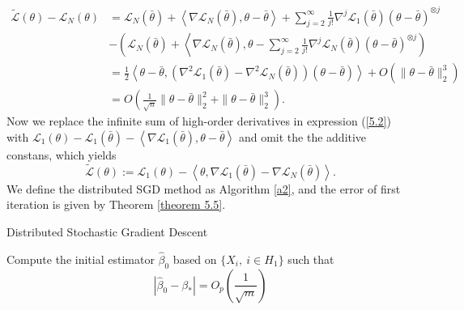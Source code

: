 \documentclass[12pt]{article}
\numberwithin{equation}{section}
\begin{document}
\begin{align*} 
\widetilde{\mathcal{L}}(\theta)-\mathcal{L}_{N}(\theta) &=\mathcal{L}_{N}(\bar{\theta})+\left\langle\nabla \mathcal{L}_{N}(\bar{\theta}), \theta-\bar{\theta}\right\rangle+\sum_{j=2}^{\infty} \frac{1}{j !} \nabla^{j} \mathcal{L}_{1}(\bar{\theta})(\theta-\bar{\theta})^{\otimes j} \\ &-\left(\mathcal{L}_{N}(\bar{\theta})+\left\langle\nabla \mathcal{L}_{N}(\bar{\theta}), \theta-\sum_{j=2}^{\infty} \frac{1}{j !} \nabla^{j} \mathcal{L}_{N}(\bar{\theta})(\theta-\bar{\theta})^{\otimes j}\right)\right.\\ &=\frac{1}{2}\left\langle\theta-\bar{\theta},\left(\nabla^{2} \mathcal{L}_{1}(\bar{\theta})-\nabla^{2} \mathcal{L}_{N}(\bar{\theta})\right)(\theta-\bar{\theta})\right\rangle+ O\left(\|\theta-\bar{\theta}\|_{2}^{3}\right) \\ &=O\left(\frac{1}{\sqrt{n}}\|\theta-\bar{\theta}\|_{2}^{2}+\|\theta-\bar{\theta}\|_{2}^{3}\right).
\end{align*}
Now we replace the infinite sum of high-order derivatives in expression (\ref{5.2}) with $\mathcal{L}_{1}(\theta)-\mathcal{L}_{1}(\bar{\theta})-\left\langle\nabla \mathcal{L}_{1}(\bar{\theta}), \theta-\bar{\theta}\right\rangle$ and omit the the additive constans, which yields 
\begin{equation}
\widetilde{\mathcal{L}}(\theta):=\mathcal{L}_{1}(\theta)-\left\langle\theta, \nabla \mathcal{L}_{1}(\bar{\theta})-\nabla \mathcal{L}_{N}(\bar{\theta})\right\rangle.
\end{equation}
We define the distributed SGD method as Algorithm \ref{a2}, and the error of first iteration is given by Theorem \ref{theorem 5.5}.
\IncMargin{1em} %
\begin{algorithm}[hbt!]
	\caption{Distributed Stochastic Gradient Descent\label{a2}}
	\SetAlgoNoLine %
	
	\BlankLine
	
	Compute the initial estimator $\hat \beta_0$ based on $\{X_i,\ i\in H_1\}$ such that
	$$
	|\hat \beta_0-\beta_{*}|=O_p(\frac{1}{\sqrt{m}})
	$$ \\%
\end{algorithm}
\end{document}
